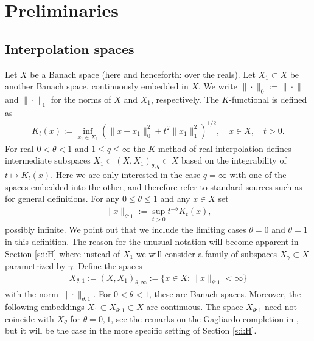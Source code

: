 \documentclass[10pt, a4paper]{iopart}
\newcommand{\norm}[2]{     \| #1       \|_{ #2 }}
\theoremstyle{remark}
\theoremstyle{definition}
\newcommand{\TODO}[1]{\textrm{\color{red}TODO: #1}}
\begin{document}
\section{Preliminaries}
\label{s:i}

\subsection{Interpolation spaces}

Let $X$ be a Banach space (here and henceforth: over the reals).
%
Let $X_1 \subset X$ be another Banach space,
continuously 
embedded in $X$.
%
We write $\norm{\cdot}{0} := \norm{\cdot}{}$ and $\norm{\cdot}{1}$
for the norms of $X$ and $X_1$, respectively.
%
%
The $K$-functional
is defined as
\begin{align}
\label{e:K}
	K_t(x) :=
	\inf_{x_1 \in X_1}
	(
		\norm{x - x_1}{0}^2
		+
		t^2
		\norm{x_1}{1}^2
	)^{1/2}
	,
	\quad x \in X,
	\quad t > 0.
\end{align}
%
For real $0 < \theta < 1$ and $1 \leq q \leq \infty$
the $K$-method of real interpolation
defines intermediate subspaces 
$X_1 \subset (X, X_1)_{\theta, q} \subset X$
based on the integrability of $t \mapsto K_t(x)$.
%
Here we are only interested in the case $q = \infty$ 
with one of the spaces embedded into the other,
and therefore
refer to standard sources
such as 
\cite{BerghLofstrom1976, BennettSharpley1988}
for general definitions.
%
For any $0 \leq \theta \leq 1$ and any $x \in X$ set
\begin{align}
\label{e:||nu}
	\norm{x}{\theta:1}
	:=
	\sup_{t > 0}
	t^{-\theta}
	K_t(x)
	,
\end{align}
possibly infinite.
%
We point out
that 
we include the limiting cases $\theta = 0$ and $\theta = 1$
in this definition.
%
The reason for the unusual notation 
will become apparent in Section \ref{s:i:H}
where 
instead of $X_1$
we will 
consider a family of subspaces $X_\gamma \subset X$
parametrized by $\gamma$.
%
Define the spaces
\begin{align}
	X_{\theta:1} 
	:=
	( X, X_1 )_{\theta, \infty}
	:=
	\{
		x \in X :
		\norm{x}{\theta:1} < \infty
	\}
\end{align}
with the norm $\norm{\cdot}{\theta:1}$.
%
For $0 < \theta < 1$,
these are Banach spaces.
%
Moreover,
the following embeddings 
$
	X_1 \subset X_{\theta:1} \subset X
$
are continuous.
%
%
The space $X_{\theta:1}$ need not coincide with $X_\theta$
for $\theta = 0,1$,
see the remarks on the Gagliardo completion in \cite[Chapter 5, \S1]{BennettSharpley1988},
but it will be the case in 
the more specific setting of Section \ref{s:i:H}.
\end{document}
